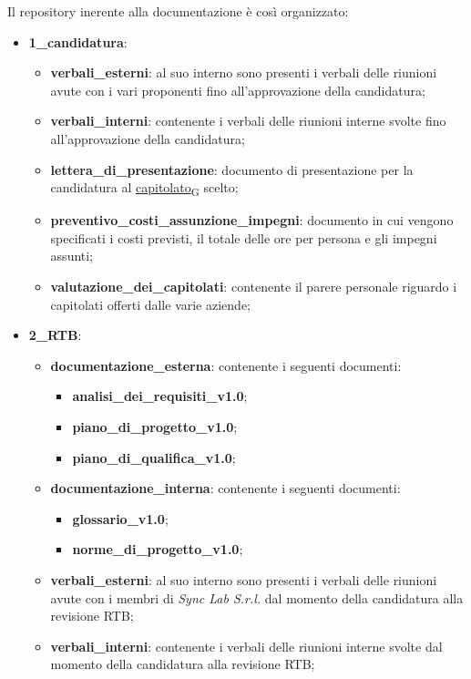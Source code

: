 Il repository inerente alla documentazione è così organizzato:
\begin{itemize}
	\item \textbf{1\_candidatura}:
	\begin{itemize}
		\item \textbf{verbali\_esterni}: al suo interno sono presenti i verbali delle riunioni avute con i vari proponenti fino all'approvazione della candidatura;
		\item \textbf{verbali\_interni}: contenente i verbali delle riunioni interne svolte fino all'approvazione della candidatura;
		\item \textbf{lettera\_di\_presentazione}: documento di presentazione per la candidatura al \href{https://7last.github.io/docs/rtb/documentazione-interna/glossario\#capitolato}{capitolato\textsubscript{G}} scelto;
		\item \textbf{preventivo\_costi\_assunzione\_impegni}: documento in cui vengono specificati i costi previsti, il totale delle ore per persona e gli impegni assunti;
		\item \textbf{valutazione\_dei\_capitolati}: contenente il parere personale riguardo i capitolati offerti dalle varie aziende;
	\end{itemize}
	\item \textbf{2\_RTB}:
	\begin{itemize}
		\item \textbf{documentazione\_esterna}: contenente i seguenti documenti:
		\begin{itemize}
			\item \textbf{analisi\_dei\_requisiti\_v1.0};
			\item \textbf{piano\_di\_progetto\_v1.0};
			\item \textbf{piano\_di\_qualifica\_v1.0};
		\end{itemize}
		\item \textbf{documentazione\_interna}: contenente i seguenti documenti:
		\begin{itemize}
			\item \textbf{glossario\_v1.0};
			\item \textbf{norme\_di\_progetto\_v1.0};
		\end{itemize}
		\item \textbf{verbali\_esterni}: al suo interno sono presenti i verbali delle riunioni avute con i membri di \textit{Sync Lab S.r.l.} dal momento della candidatura alla revisione RTB;
		\item \textbf{verbali\_interni}: contenente i verbali delle riunioni interne svolte dal momento della candidatura alla revisione RTB;

\end{itemize}
\end{itemize}
